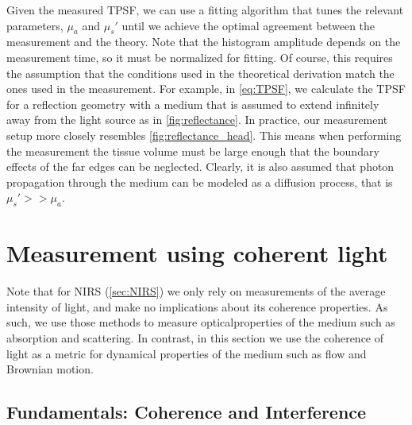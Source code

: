 Given the measured TPSF, we can use a fitting algorithm that tunes the relevant parameters, $\mu_a$ and $\mu_s'$ until we achieve the optimal agreement between the measurement and the theory. Note that the histogram amplitude depends on the measurement time, so it must be normalized for fitting. Of course, this requires the assumption that the conditions used in the theoretical derivation match the ones used in the measurement. For example, in \autoref{eq:TPSF}, we calculate the TPSF for a reflection geometry with a medium that is assumed to extend infinitely away from the light source as in \autoref{fig:reflectance}. In practice, our measurement setup more closely resembles \autoref{fig:reflectance_head}. This means when performing the measurement the tissue volume must be large enough that the boundary effects of the far edges can be neglected. Clearly, it is also assumed that photon propagation through the medium can be modeled as a diffusion process, that is $\mu_s' >> \mu_a$. 


\section{Measurement using coherent light} \label{sec:Coherent}
Note that for NIRS (\autoref{sec:NIRS}) we only rely on measurements of the average intensity of light, and make no implications about its coherence properties. As such, we use those methods to measure optical\footnotemark properties of the medium such as absorption and scattering. In contrast, in this section we use the coherence of light as a metric for dynamical properties of the medium such as flow and Brownian motion.


\subsection{Fundamentals: Coherence and Interference} \label{sec:fundamentals_coherence}

